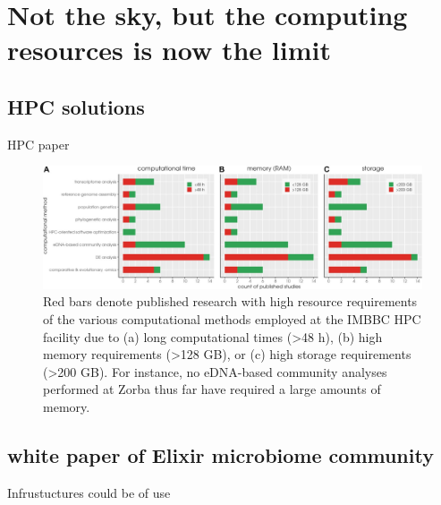 \chapter{Not the sky, but the computing resources is now the limit}
\label{cha:6}


\section{HPC solutions}

HPC paper

\begin{figure}{}
   \centering
   \includegraphics[width=140mm]{figures/zorbas_jobs_resources.jpeg}
   \caption{Red bars denote published research with high resource requirements of the various computational methods employed at the IMBBC HPC facility due to (a) long computational times (>48 h), (b) high memory requirements (>128 GB), or (c) high storage requirements (>200 GB). For instance, no eDNA-based community analyses performed at Zorba thus far have required a large amounts of memory.}
   \label{fig:zorba_jobs}
\end{figure}

\section{white paper of Elixir microbiome community}


Infrustuctures could be of use

